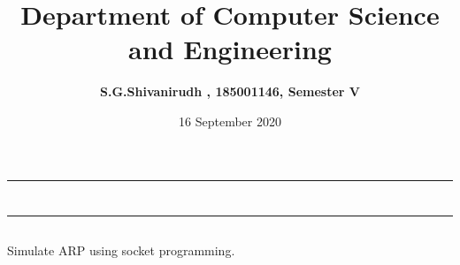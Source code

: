 \documentclass[12pt,letterpaper]{article}
\title{\textbf{Department of Computer Science and Engineering}}
\author{\textbf{S.G.Shivanirudh , 185001146, Semester V }}
\date{16 September 2020}
\begin{document}
\maketitle
\hrule
\section*{}
\hrule 
\bigskip\bigskip

\subsection*{}

\subsection*{}
\begin{flushleft}
Simulate ARP using socket programming.
\end{flushleft}

\subsection*{}
\subsubsection*{}
\begin{flushleft}

\end{flushleft}
\subsubsection*{}
\begin{flushleft}

\end{flushleft}
\subsubsection*{}
\begin{flushleft}

\end{flushleft}

\subsection*{}
\end{document}
